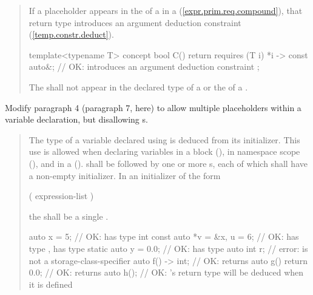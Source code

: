 \begin{quote}
\begin{addedblock}
\pnum
If a placeholder appears in the 
of a  in a  
(\ref{expr.prim.req.compound}), that return type introduces an argument 
deduction constraint (\ref{temp.constr.deduct}).
% 
\enterexample
\begin{codeblock}
template<typename T> concept bool C() {
  return requires (T i) { 
    {*i} -> const auto&; // OK: introduces an argument deduction constraint
  };
}
\end{codeblock}
\exitexample

\pnum
The   shall not appear
in the declared type of a  or the
 of a .
\end{addedblock}
\end{quote}


Modify paragraph 4 (paragraph 7, here) to allow multiple placeholders within a 
variable declaration, but disallowing s.

\begin{quote}
\pnum
The type of a variable declared using 
is deduced from its initializer.
% 
This use is allowed when declaring variables in a block (),
in namespace scope (), and in a 
 ().
%
%
   shall be followed by one or more s,
each of which shall have a non-empty initializer.
%
In an initializer of the form
\begin{codeblock}
( expression-list )
\end{codeblock}
the  shall be a single 
.
% 
\enterexample
\begin{codeblock}
auto x = 5;                // OK:  has type int
const auto *v = &x, u = 6; // OK:  has type ,  has type 
static auto y = 0.0;       // OK:  has type 
auto int r;                // error:  is not a storage-class-specifier
auto f() -> int;           // OK:  returns 
auto g() { return 0.0; }   // OK:  returns 
auto h();                  // OK: 's return type will be deduced when it is defined
\end{codeblock}
\exitexample
\end{quote}

